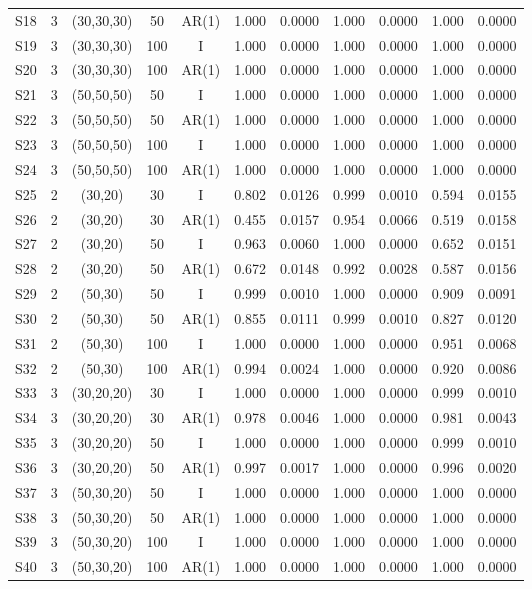 \begin{table}[ht]
\begin{tabular}{ccccccccccc}
S18 & 3 & (30,30,30) & 50 & AR(1) & 1.000 & 0.0000 & 1.000 & 0.0000 & 1.000 & 0.0000 \\
S19 & 3 & (30,30,30) & 100 & I & 1.000 & 0.0000 & 1.000 & 0.0000 & 1.000 & 0.0000 \\
S20 & 3 & (30,30,30) & 100 & AR(1) & 1.000 & 0.0000 & 1.000 & 0.0000 & 1.000 & 0.0000 \\
S21 & 3 & (50,50,50) & 50 & I & 1.000 & 0.0000 & 1.000 & 0.0000 & 1.000 & 0.0000 \\
S22 & 3 & (50,50,50) & 50 & AR(1) & 1.000 & 0.0000 & 1.000 & 0.0000 & 1.000 & 0.0000 \\
S23 & 3 & (50,50,50) & 100 & I & 1.000 & 0.0000 & 1.000 & 0.0000 & 1.000 & 0.0000 \\
S24 & 3 & (50,50,50) & 100 & AR(1) & 1.000 & 0.0000 & 1.000 & 0.0000 & 1.000 & 0.0000 \\
S25 & 2 & (30,20) & 30 & I & 0.802 & 0.0126 & 0.999 & 0.0010 & 0.594 & 0.0155 \\
S26 & 2 & (30,20) & 30 & AR(1) & 0.455 & 0.0157 & 0.954 & 0.0066 & 0.519 & 0.0158 \\
S27 & 2 & (30,20) & 50 & I & 0.963 & 0.0060 & 1.000 & 0.0000 & 0.652 & 0.0151 \\
S28 & 2 & (30,20) & 50 & AR(1) & 0.672 & 0.0148 & 0.992 & 0.0028 & 0.587 & 0.0156 \\
S29 & 2 & (50,30) & 50 & I & 0.999 & 0.0010 & 1.000 & 0.0000 & 0.909 & 0.0091 \\
S30 & 2 & (50,30) & 50 & AR(1) & 0.855 & 0.0111 & 0.999 & 0.0010 & 0.827 & 0.0120 \\
S31 & 2 & (50,30) & 100 & I & 1.000 & 0.0000 & 1.000 & 0.0000 & 0.951 & 0.0068 \\
S32 & 2 & (50,30) & 100 & AR(1) & 0.994 & 0.0024 & 1.000 & 0.0000 & 0.920 & 0.0086 \\
S33 & 3 & (30,20,20) & 30 & I & 1.000 & 0.0000 & 1.000 & 0.0000 & 0.999 & 0.0010 \\
S34 & 3 & (30,20,20) & 30 & AR(1) & 0.978 & 0.0046 & 1.000 & 0.0000 & 0.981 & 0.0043 \\
S35 & 3 & (30,20,20) & 50 & I & 1.000 & 0.0000 & 1.000 & 0.0000 & 0.999 & 0.0010 \\
S36 & 3 & (30,20,20) & 50 & AR(1) & 0.997 & 0.0017 & 1.000 & 0.0000 & 0.996 & 0.0020 \\
S37 & 3 & (50,30,20) & 50 & I & 1.000 & 0.0000 & 1.000 & 0.0000 & 1.000 & 0.0000 \\
S38 & 3 & (50,30,20) & 50 & AR(1) & 1.000 & 0.0000 & 1.000 & 0.0000 & 1.000 & 0.0000 \\
S39 & 3 & (50,30,20) & 100 & I & 1.000 & 0.0000 & 1.000 & 0.0000 & 1.000 & 0.0000 \\
S40 & 3 & (50,30,20) & 100 & AR(1) & 1.000 & 0.0000 & 1.000 & 0.0000 & 1.000 & 0.0000 \\
\hline
\end{tabular}
\end{table}
